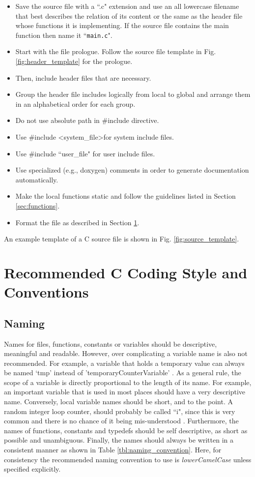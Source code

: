 \documentclass[11pt]{article}
\begin{document}
\begin{itemize}
	\item Save the source file with a ``.c" extension and use an all lowercase filename that best describes the relation of its content or the same as the header file whose functions it is implementing. If the source file contains the main function then name it ``\texttt{main.c}".
	\item Start with the file prologue. Follow the source file template in Fig. \ref{fig:header_template} for the prologue.
	\item Then, include header files that are necessary.
	\item Group the header file includes logically from local to global and arrange them in an alphabetical order for each group.
	\item Do not use absolute path in \#include directive.
	\item Use \#include \textless system\_file\textgreater for system include files.
	\item Use \#include ``user\_file" for user include files.
	\item Use specialized (e.g., doxygen) comments in order to generate documentation automatically.
	\item Make the local functions static and follow the guidelines listed in Section \ref{sec:functions}.
	\item Format the file as described in Section \ref{sec:code_style}.
\end{itemize}

An example template of a C source file is shown in Fig. \ref{fig:source_template}.


\section{Recommended C Coding Style and Conventions}
\label{sec:code_style}

\subsection{Naming}
Names for files, functions, constants or variables should be descriptive, meaningful and readable. However, over complicating a variable name is also not recommended. For example, a variable that holds a temporary value can always be named `tmp' instead of 'temporaryCounterVariable' \cite{linux_style}. As a general rule, the scope of a variable is directly proportional to the length of its name. For example, an important variable that is used in most places should have a very descriptive name. Conversely, local variable names should be short, and to the point. A random integer loop counter, should probably be called ``i", since this is very common and there is no chance of it being mis-understood \cite{linux_style}. Furthermore, the names of functions, constants and typedefs should be self descriptive, as short as possible and unambiguous. Finally, the names should always be written in a consistent manner as shown in Table \ref{tbl:naming_convention}. Here, for consistency the  recommended naming convention to use is \emph{lowerCamelCase} unless specified explicitly.
\end{document}
